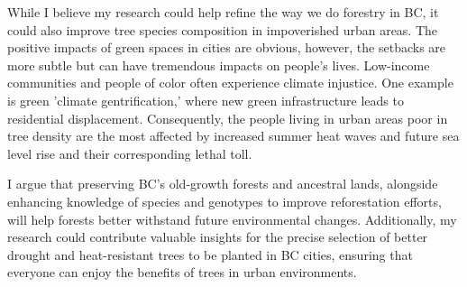\documentclass[11pt,letter]{article}
\begin{document}
While I believe my research could help refine the way we do forestry in BC, it could also improve tree species composition in impoverished urban areas. The positive impacts of green spaces in cities are obvious, however, the setbacks are more subtle but can have tremendous impacts on people's lives. Low-income communities and people of color often experience climate injustice. One example is green 'climate gentrification,' where new green infrastructure leads to residential displacement. \citep{anguelovski_why_2019} Consequently, the people living in urban areas poor in tree density are the most affected by increased summer heat waves and future sea level rise and their corresponding lethal toll. \citep{anguelovski_why_2019,triffo_green_2022} 

I argue that preserving BC's old-growth forests and ancestral lands, alongside enhancing knowledge of species and genotypes to improve reforestation efforts, will help forests better withstand future environmental changes. Additionally, my research could contribute valuable insights for the precise selection of better drought and heat-resistant trees to be planted in BC cities, ensuring that everyone can enjoy the benefits of trees in urban environments.

\end{document}
